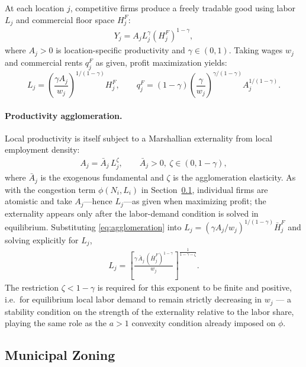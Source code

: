 \documentclass[12pt, a4paper]{article}
\theoremstyle{definition}
\theoremstyle{remark}
\begin{document}
At each location $j$, competitive firms produce a freely tradable good using labor $L_j$ and commercial floor space $H_j^F$:
\begin{align}
    \label{eq:firm-production}
Y_j = A_j L_j^{\gamma}(H_j^F)^{1-\gamma},
\end{align}
where $A_j > 0$ is location-specific productivity and $\gamma \in (0,1)$. Taking wages $w_j$ and commercial rents $q_j^F$ as given, profit maximization yields:
\[
L_{j}=(\frac{\gamma A_{j}}{w_{j}})^{1/(1-\gamma)}H_{j}^F, \qquad
q_{j}^F=(1-\gamma)(\frac{\gamma}{w_{j}})^{\gamma/(1-\gamma)}A_{j}^{1/(1-\gamma)}.
\]

\paragraph{Productivity agglomeration.} Local productivity is itself subject to a Marshallian externality from local employment density:
\begin{align}
    \label{eq:agglomeration}
    A_j = \bar A_j\,L_j^{\zeta}, \qquad \bar A_j>0,\ \zeta\in(0,1-\gamma),
\end{align}
where $\bar A_j$ is the exogenous fundamental and $\zeta$ is the agglomeration elasticity. As with the congestion term $\phi(N_i,L_i)$ in Section~\ref{sec:municipal-zoning}, individual firms are atomistic and take $A_j$---hence $L_j$---as given when maximizing profit; the externality appears only after the labor-demand condition is solved in equilibrium. Substituting \eqref{eq:agglomeration} into $L_j=(\gamma A_j/w_j)^{1/(1-\gamma)}\bar H_j^F$ and solving explicitly for $L_j$,
\begin{align}
    \label{eq:labor-demand-agglom}
    L_j = \left[\frac{\gamma\,\bar A_j\,(\bar H_j^F)^{1-\gamma}}{w_j}\right]^{\frac{1}{1-\gamma-\zeta}}.
\end{align}
The restriction $\zeta<1-\gamma$ is required for this exponent to be finite and positive, i.e.\ for equilibrium local labor demand to remain strictly decreasing in $w_j$ — a stability condition on the strength of the externality relative to the labor share, playing the same role as the $a>1$ convexity condition already imposed on $\phi$.


\subsection{Municipal Zoning}
\label{sec:municipal-zoning}
\end{document}
